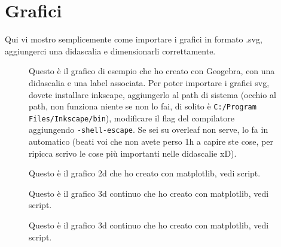 \chapter{Grafici}
Qui vi mostro semplicemente come importare i grafici in formato .svg, aggiungerci una didascalia e dimensionarli correttamente.

\begin{figure}[!h]
	\centering
	
	\caption{Questo è il grafico di esempio che ho creato con Geogebra, con una didascalia e una label associata. Per poter importare i grafici svg, dovete installare inkscape, aggiungerlo al path di sistema (occhio al path, non funziona niente se non lo fai, di solito è \texttt{C:/Program Files/Inkscape/bin}), modificare il flag del compilatore aggiungendo \texttt{-shell-escape}. Se sei su overleaf non serve, lo fa in automatico (beati voi che non avete perso 1h a capire ste cose, per ripicca scrivo le cose più importanti nelle didascalie xD).}
	\label{graph:esempiografico}
\end{figure}

\hfill

\begin{figure}[!h]
	\centering
	
	\caption{Questo è il grafico 2d che ho creato con matplotlib, vedi script.}
	\label{graph:esempiograficopy}
\end{figure}

\hfill

\begin{figure}[!h]
	\centering
	
	\caption{Questo è il grafico 3d continuo che ho creato con matplotlib, vedi script.}
	\label{graph:esempiograficopy2}
\end{figure}

\hfill

\begin{figure}[!h]
	\centering
	
	\caption{Questo è il grafico 3d continuo che ho creato con matplotlib, vedi script.}
	\label{graph:esempiograficopy3}
\end{figure}

